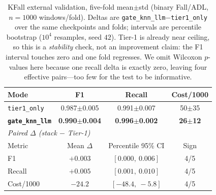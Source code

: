 \begin{table}[!t]
\centering
\caption{KFall external validation, five-fold mean$\pm$std (binary Fall/ADL, $n{=}1000$ windows/fold). Deltas are \texttt{gate\_knn\_llm}$-$\texttt{tier1\_only} over the same checkpoints and folds; intervals are percentile bootstrap ($10^{4}$ resamples, seed $42$). Tier-1 is already near ceiling, so this is a \emph{stability} check, not an improvement claim: the F1 interval touches zero and one fold regresses. We omit Wilcoxon $p$-values here because one recall delta is exactly zero, leaving four effective pairs---too few for the test to be informative.}
\label{tab:kfallmean}
\begin{tabular}{lccc}
\toprule
Mode & F1 & Recall & Cost/1000 \\
\midrule
\texttt{tier1\_only}   & 0.987$\pm$0.005 & 0.991$\pm$0.007 & 50$\pm$35 \\
\textbf{\texttt{gate\_knn\_llm}} & \textbf{0.990$\pm$0.004} & \textbf{0.996$\pm$0.002} & \textbf{26$\pm$12} \\
\midrule
\multicolumn{4}{l}{\textit{Paired $\Delta$ (stack $-$ Tier-1)}} \\
\midrule
Metric & Mean $\Delta$ & Percentile 95\% CI & Sign \\
\midrule
F1        & $+0.003$  & $[0.000,\ 0.006]$  & 4/5 \\
Recall    & $+0.005$  & $[0.001,\ 0.010]$  & 4/5 \\
Cost/1000 & $-24.2$   & $[-48.4,\ -5.8]$   & 4/5 \\
\bottomrule
\end{tabular}
\end{table}
